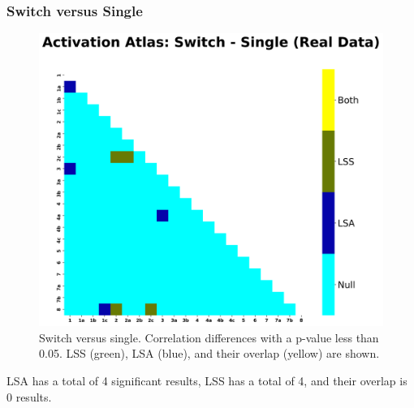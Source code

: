 \documentclass[10pt,letterpaper]{article}
\begin{document}
\subsubsection*{Switch versus Single}
\label{results:bsc-switchXsingle}

\begin{figure}[H]
  \centering
  \includegraphics[width=\textwidth]{data-task_atlas-activation_contrast-switchXsingle}
  \caption{
    Switch versus single. Correlation differences with a p-value less than 0.05.
    LSS (green), LSA (blue), and their overlap (yellow) are shown.
  }
  \label{fig:switchvsingle}
\end{figure}

LSA has a total of 4 significant results, LSS has a total of 4,
and their overlap is 0 results.
\end{document}

